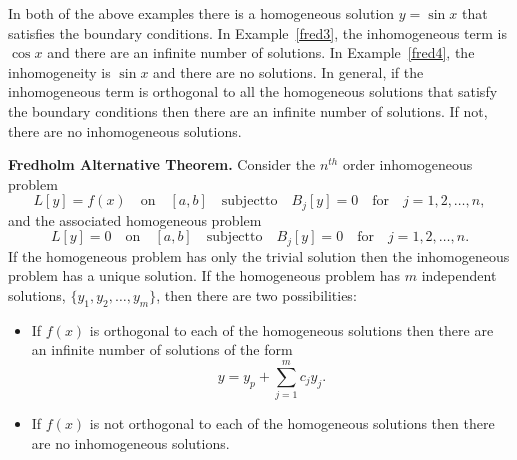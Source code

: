 In both of the above examples there is a homogeneous solution
$y = \sin x$ that satisfies
the boundary conditions.  In Example~\ref{fred3}, the 
inhomogeneous term is $\cos x$ and there are an infinite number of solutions.
In Example~\ref{fred4}, the inhomogeneity is $\sin x$ and there are no
solutions.  In general, if the inhomogeneous term is orthogonal to all the
homogeneous solutions that satisfy the boundary conditions then there are
an infinite number of solutions.  If not, there are no inhomogeneous 
solutions.  





\begin{Result}
  \textbf{Fredholm Alternative Theorem.}  
  Consider the $n^{t h}$ order inhomogeneous problem
  \[ L[y] = f(x) \quad \mathrm{on} \quad [a,b] \quad \mathrm{subject to} \quad
  B_j[y] = 0 \quad \mathrm{for} \quad j = 1, 2, \ldots, n, \]
  and the associated homogeneous problem
  \[ L[y] = 0 \quad \mathrm{on} \quad [a,b] \quad \mathrm{subject to} \quad
  B_j[y] = 0 \quad \mathrm{for} \quad j = 1, 2, \ldots, n. \]
  If the homogeneous problem has only the trivial solution then the 
  inhomogeneous problem has a unique solution.
  If the homogeneous problem has $m$ independent solutions, $\{y_1, y_2, 
  \ldots, y_m \}$, then there are two possibilities:
  \begin{itemize}
  \item If $f(x)$ is orthogonal to each of the homogeneous solutions then there
    are an infinite number of solutions of the form
    \[ y = y_p + \sum_{j=1}^m c_j y_j.\]
  \item If $f(x)$ is not orthogonal to each of the homogeneous solutions then
    there are no inhomogeneous solutions.
  \end{itemize}
\end{Result}







